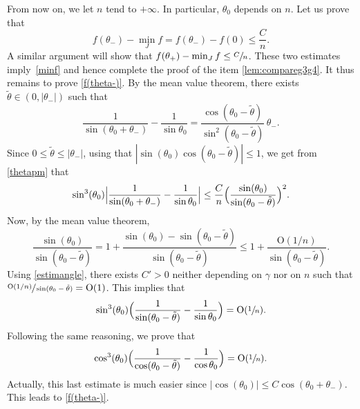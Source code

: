 \documentclass[10pt]{amsart}
\theoremstyle{definition}
\begin{document}
From now on, we let $n$ tend to $+\infty$. In particular, $\theta_0$ depends on $n$.
Let us prove that
\begin{equation} \label{f(theta-)}
f(\theta_-)-\min_J f =f(\theta_-) - f(0) \leq \frac{C}{n}.
\end{equation}
A similar argument will show that $f(\theta_+)-\min_J f \leq \sfrac{C}{n}$.
These two estimates imply~\eqref{minf} and hence complete the proof of the item \ref{lem:compareg3g4}.
It thus remains to prove
\eqref{f(theta-)}.
By the mean value theorem, there exists $\tilde \theta \in (0,|\theta_-|)$ such that
\[\frac{1}{\sin (\theta_0 + \theta_-)} - \frac{1}{\sin \theta_0}=\frac{\cos (\theta_0-\tilde \theta)}{\sin^2(\theta_0-\tilde \theta)}\, \theta_-.
\]
Since $0 \leq \tilde \theta \leq |\theta_-|$, using that $|\sin(\theta_0) \cos(\theta_0 - \tilde \theta)| \leq 1$, we get from \eqref{thetapm} that
\[\sin^3(\theta_0) \Bigl| \frac{1}{\sin (\theta_0+\theta_-)} - \frac{1}{\sin \theta_0} \Bigr| \leq \frac{C}{n} \Bigl( \frac{\sin(\theta_0)}{\sin(\theta_0 - \tilde \theta)} \Bigr)^2.\]
Now, by the mean value theorem,
\[\frac{\sin(\theta_0)}{\sin(\theta_0 -\tilde \theta)} = 1 + \frac{\sin(\theta_0) - \sin(\theta_0 -\tilde \theta) }{\sin(\theta_0 -\tilde \theta)} \leq 1 + \frac{\mathrm{O}(1/n)}{\sin(\theta_0 - \tilde \theta)}.\]
Using \eqref{estimangle}, there exists $C'>0$ neither depending on $\gamma$ nor on $n$ such that $\sfrac{\mathrm{O}(1/n)}{\sin(\theta_0 -\tilde \theta)} =\mathrm{O}(1)$. This implies that
\[\sin^3(\theta_0) \Bigl( \frac{1}{\sin (\theta_0 -\tilde \theta)} - \frac{1}{\sin \theta_0} \Bigr) =\mathrm{O}(\sfrac{1}{n}).\]
Following the same reasoning, we prove that
\[
\cos^3(\theta_0) \Bigl( \frac{1}{\cos (\theta_0 - \tilde \theta)} - \frac{1}{\cos \theta_0} \Bigr) = \mathrm{O}(\sfrac{1}{n}).
\]
Actually, this last estimate is much easier since $|\cos(\theta_0)| \leq C \cos(\theta_0 + \theta_-)$. This leads to \eqref{f(theta-)}.
\end{document}
